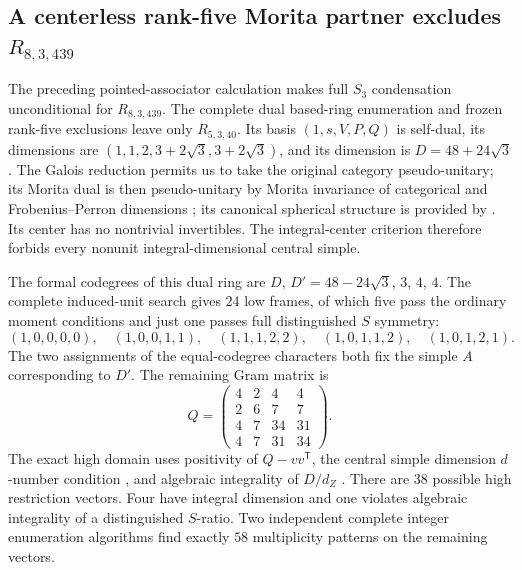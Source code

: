 \subsection{A centerless rank-five Morita partner excludes \texorpdfstring{$R_{8,3,439}$}{R8,3,439}}
\label{subsec:r439-centerless-morita}

The preceding pointed-associator calculation makes full $S_3$
condensation unconditional for $R_{8,3,439}$.  The complete dual
based-ring enumeration and frozen rank-five exclusions leave only
$R_{5,3,40}$.  Its basis $(1,s,V,P,Q)$ is self-dual, its dimensions are
$(1,1,2,3+2\sqrt3,3+2\sqrt3)$, and its dimension is
$D=48+24\sqrt3$.  The Galois reduction permits us to take the original
category pseudo-unitary; its Morita dual is then pseudo-unitary by
Morita invariance of categorical and Frobenius--Perron dimensions
\cite[Theorem~2.15 and Corollary~8.14]{ENO};
its canonical spherical structure is provided by
\cite[Proposition~8.23]{ENO}.
Its center has no nontrivial invertibles.  The integral-center
criterion therefore forbids every nonunit integral-dimensional
central simple.

The formal codegrees of this dual ring are $D$, $D'=48-24\sqrt3$,
$3$, $4$, $4$.  The complete induced-unit search gives $24$ low
frames, of which five pass the ordinary moment conditions and just
one passes full distinguished $S$ symmetry:
\[
 (1,0,0,0,0),\quad(1,0,0,1,1),\quad(1,1,1,2,2),\quad
 (1,0,1,1,2),\quad(1,0,1,2,1).
\]
The two assignments of the equal-codegree characters both fix the
simple $A$ corresponding to $D'$.  The remaining Gram matrix is
\[
 Q=\begin{pmatrix}4&2&4&4\\2&6&7&7\\4&7&34&31\\4&7&31&34\end{pmatrix}.
\]
The exact high domain uses positivity of $Q-vv^{\mathsf T}$, the
central simple dimension $d$-number condition
\cite[Theorem~1.8]{OstrikCode}, and algebraic integrality of
$D/d_Z$ \cite[Proposition~3.3]{ENO}.
There are $38$ possible high restriction vectors.  Four have integral
dimension and one violates algebraic integrality of a distinguished
$S$-ratio.  Two independent complete integer enumeration algorithms
find exactly $58$ multiplicity patterns on the remaining vectors.

